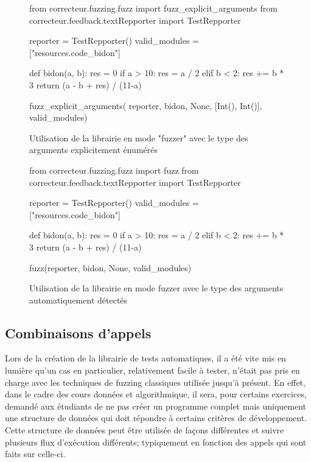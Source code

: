 \documentclass[a4paper]{report}
\begin{document}
\begin{figure}[ht]
\begin{python}
from correcteur.fuzzing.fuzz import fuzz_explicit_arguments
from correcteur.feedback.textRepporter import TestRepporter


reporter = TestRepporter()
valid_modules = ["resources.code_bidon"]

def bidon(a, b):
    res = 0
    if a > 10:
        res = a / 2
    elif b < 2:
        res += b * 3
    return (a - b + res) / (11-a)


fuzz_explicit_arguments(
	reporter,
	bidon,
	None,
	[Int(), Int()],
	valid_modules)
\end{python}
	\caption{Utilisation de la librairie en mode "fuzzer" avec le type des arguments explicitement énumérés}
	
	\label{fig:fuzzer_args}
\end{figure}

\begin{figure}[ht]
\begin{python}
from correcteur.fuzzing.fuzz import fuzz
from correcteur.feedback.textRepporter import TestRepporter


reporter = TestRepporter()
valid_modules = ["resources.code_bidon"]

def bidon(a, b):
    res = 0
    if a > 10:
        res = a / 2
    elif b < 2:
        res += b * 3
    return (a - b + res) / (11-a)


fuzz(reporter,
	bidon,
	None,
	valid_modules)
\end{python}
	\caption{Utilisation de la librairie en mode fuzzer avec le type des arguments automatiquement détectés}
	
	\label{fig:fuzzer_no_args}
\end{figure}


\subsection{Combinaisons d'appels}

Lors de la création de la librairie de tests automatiques, il a été vite mis en lumière qu'un cas en particulier, relativement facile à tester, n'était pas pris en charge avec les techniques de fuzzing classiques utilisée jusqu’à présent.
En effet, dans le cadre des cours données et algorithmique, il sera, pour certains exercices, demandé aux étudiants de ne pas créer un programme complet mais uniquement une structure de données qui doit répondre à certains critères de développement.
Cette structure de données peut être utilisée de façons différentes et suivre plusieurs flux d'exécution différents; typiquement en fonction des appels qui sont faits sur celle-ci.
\end{document}
